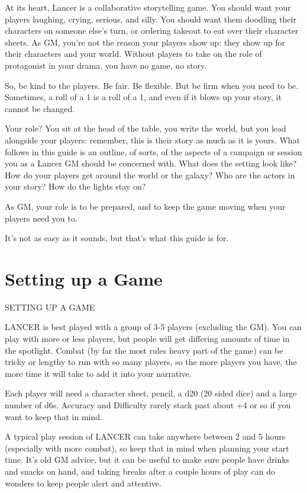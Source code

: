 At its heart, Lancer is a collaborative storytelling game. You should want your players
laughing, crying, serious, and silly. You should want them doodling their characters on someone
else’s turn, or ordering takeout to eat over their character sheets. As GM, you’re not the reason
your players show up: they show up for their characters and your world. Without players to take
on the role of protagonist in your drama, you have no game, no story.


So, be kind to the players. Be fair. Be flexible. But be firm when you need to be. Sometimes, a
roll of a 1 is a roll of a 1, and even if it blows up your story, it cannot be changed.





Your role? You sit at the head of the table, you write the world, but you lead alongside your
players: remember, this is their story as much as it is yours. What follows in this guide is an
outline, of sorts, of the aspects of a campaign or session you as a Lancer GM should be
concerned with. What does the setting look like? How do your players get around the world or
the galaxy? Who are the actors in your story? How do the lights stay on?


As GM, your role is to be prepared, and to keep the game moving when your players need you
to.


It’s not as easy as it sounds, but that’s what this guide is for.

\chapter{Setting up a Game}


                            SETTING UP A GAME

LANCER is best played with a group of 3-5 players (excluding the GM). You can play with more
or less players, but people will get differing amounts of time in the spotlight. Combat (by far the
most rules heavy part of the game) can be tricky or lengthy to run with so many players, so the
more players you have, the more time it will take to add it into your narrative.


Each player will need a character sheet, pencil, a d20 (20 sided dice) and a large number of
d6s. Accuracy and Difficulty rarely stack past about +4 or so if you want to keep that in mind.


A typical play session of LANCER can take anywhere between 2 and 5 hours (especially with
more combat), so keep that in mind when planning your start time. It’s old GM advice, but it can
be useful to make sure people have drinks and snacks on hand, and taking breaks after a couple
hours of play can do wonders to keep people alert and attentive.


